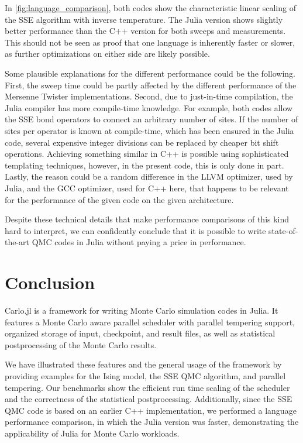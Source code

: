 \documentclass{SciPost}
\begin{document}
In \cref{fig:language_comparison}, both codes show the characteristic linear scaling of the SSE algorithm with inverse temperature. The Julia version shows slightly better performance than the C++ version for both sweeps and measurements. This should not be seen as proof that one language is inherently faster or slower, as further optimizations on either side are likely possible.

Some plausible explanations for the different performance could be the following. First, the sweep time could be partly affected by the different performance of the Mersenne Twister implementations. Second, due to just-in-time compilation, the Julia compiler has more compile-time knowledge. For example, both codes allow the SSE bond operators to connect an arbitrary number of sites. If the number of sites per operator is known at compile-time, which has been ensured in the Julia code, several expensive integer divisions can be replaced by cheaper bit shift operations. Achieving something similar in C++ is possible using sophisticated templating techniques, however, in the present code, this is only done in part. Lastly, the reason could be a random difference in the LLVM optimizer, used by Julia, and the GCC optimizer, used for C++ here, that happens to be relevant for the performance of the given code on the given architecture.

Despite these technical details that make performance comparisons of this kind hard to interpret, we can confidently conclude that it is possible to write state-of-the-art QMC codes in Julia without paying a price in performance.
\section{Conclusion}
\label{sec:conclusion}
Carlo.jl is a framework for writing Monte Carlo simulation codes in Julia. It features a Monte Carlo aware parallel scheduler with parallel tempering support, organized storage of input, checkpoint, and result files, as well as statistical postprocessing of the Monte Carlo results.

We have illustrated these features and the general usage of the framework by providing examples for the Ising model, the SSE QMC algorithm, and parallel tempering. Our benchmarks show the efficient run time scaling of the scheduler and the correctness of the statistical postprocessing. Additionally, since the SSE QMC code is based on an earlier C++ implementation, we performed a language performance comparison, in which the Julia version was faster, demonstrating the applicability of Julia for Monte Carlo workloads.
\end{document}
